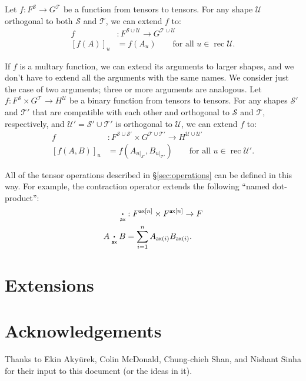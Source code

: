 \documentclass{article}
\DeclareMathOperator{\rec}{rec}
\newcommand{\restrict}[2]{\left.#1\right|_{#2}}
\begin{document}
Let $f \colon F^{\mathcal{S}} \rightarrow G^{\mathcal{T}}$ be a function from tensors to tensors. For any shape $\mathcal{U}$ orthogonal to both $\mathcal{S}$ and $\mathcal{T}$, we can extend $f$ to:
\begin{align*}
f &: F^{\mathcal{S} \cup \mathcal{U}} \rightarrow G^{\mathcal{T} \cup \mathcal{U}} \\
[f(A)]_u &= f(A_u) \qquad \text{for all $u \in \rec\mathcal{U}$.}
\end{align*}

If $f$ is a multary function, we can extend its arguments to larger shapes, and we don't have to extend all the arguments with the same names. We consider just the case of two arguments; three or more arguments are analogous. Let $f \colon F^{\mathcal{S}} \times G^{\mathcal{T}} \rightarrow H^{\mathcal{U}}$ be a binary function from tensors to tensors. For any shapes $\mathcal{S'}$ and $\mathcal{T'}$ that are compatible with each other and orthogonal to $\mathcal{S}$ and $\mathcal{T}$, respectively, and $\mathcal{U'} = \mathcal{S'} \cup \mathcal{T'}$ is orthogonal to $\mathcal{U}$, we can extend $f$ to:
\begin{align*}
f &: F^{\mathcal{S} \cup \mathcal{S'}} \times G^{\mathcal{T} \cup \mathcal{T'}} \rightarrow H^{\mathcal{U} \cup \mathcal{U'}} \\
  [f(A,B)]_u &= f\left(A_{\restrict{u}{\mathcal{S'}}},B_{\restrict{u}{\mathcal{T'}}}\right) \qquad \text{for all $u \in \rec\mathcal{U'}$.}
\end{align*}

All of the tensor operations described in \S\ref{sec:operations} can be defined in this way. For example, the contraction operator extends the following ``named dot-product'':
\begin{align*}
\mathbin{\mathop{\boldsymbol\cdot}\limits_{\mathsf{ax}}} &: F^{\mathsf{ax}[n]} \times F^{\mathsf{ax}[n]} \rightarrow F \\
A \mathbin{\mathop{\boldsymbol\cdot}\limits_{\mathsf{ax}}} B &= \sum_{i=1}^n A_{\mathsf{ax}(i)} B_{\mathsf{ax}(i)}.
\end{align*}

\section{Extensions}





\section*{Acknowledgements}

Thanks to Ekin Aky\"{u}rek, Colin McDonald, Chung-chieh Shan, and Nishant Sinha for their input to this document (or the ideas in it).

\iffalse %
\section*{References}
\fi



\end{document}

